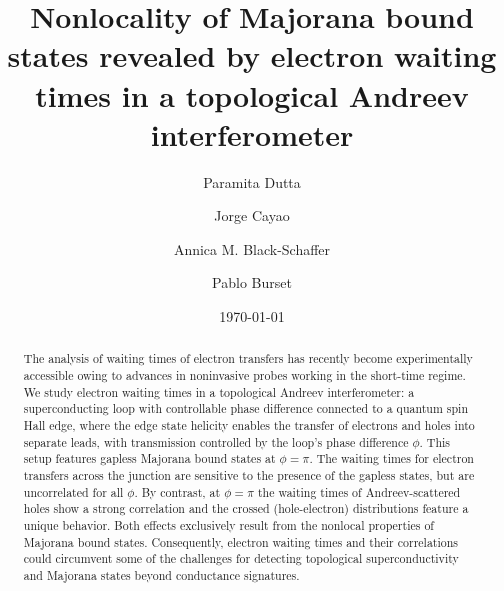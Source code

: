 \documentclass[aps,prl,amsmath,twocolumn,floatfix,superscriptaddress,longbibliography,footinbib]{revtex4-1}
\newcommand{\red}[1]{\textcolor{red}{#1}}
\begin{document}
 

\title{Nonlocality of Majorana bound states revealed by electron waiting times in a topological Andreev interferometer}

\author{Paramita Dutta\orcidA{}}

\author{Jorge Cayao\orcidB{}}

\author{Annica M. Black-Schaffer\orcidC{}}

\author{Pablo Burset\orcidD{}}

\date \today

\begin{abstract}
The analysis of waiting times of electron transfers has recently become experimentally accessible owing to advances in noninvasive probes working in the short-time regime. We study  electron waiting times in a topological Andreev interferometer: a superconducting loop with controllable phase difference connected to a quantum spin Hall edge, where the edge state helicity enables the transfer of electrons and holes into separate leads, with transmission controlled by the loop's phase difference $\phi$. This setup features gapless Majorana bound states at $\phi=\pi$. The waiting times for electron transfers across the junction are sensitive to the presence of the gapless states, but are uncorrelated for all $\phi$. By contrast, at $\phi=\pi$ the waiting times of Andreev-scattered holes show a strong correlation and the crossed (hole-electron) distributions feature a unique behavior. Both effects exclusively result from the nonlocal properties of Majorana bound states. Consequently, electron waiting times and their correlations could circumvent some of the challenges for detecting topological superconductivity and Majorana states beyond conductance signatures. 
\end{abstract}

\maketitle
\end{document}
